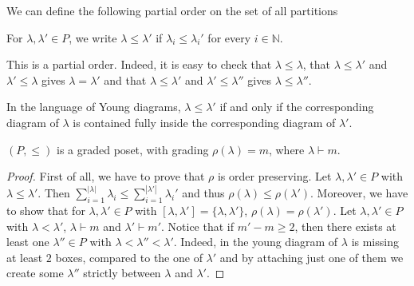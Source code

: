 We can define the following partial order on the set of all partitions
\begin{definition} For $\lambda,\lambda'\in P$, we write $\lambda\leq\lambda'$ if $\lambda_i\leq\lambda_i'$ for every $i\in\mathbb{N}$.
\end{definition}
\begin{remarks}
\begin{i_enum}
\item This is a partial order. Indeed, it is easy to check that $\lambda\leq\lambda$, that $\lambda\leq\lambda'$ and $\lambda'\leq\lambda$ gives $\lambda=\lambda'$ and that $\lambda\leq\lambda'$ and $\lambda'\leq\lambda''$ gives $\lambda\leq\lambda''$.
\item In the language of Young diagrams, $\lambda\leq\lambda'$ if and only if the corresponding diagram of $\lambda$ is contained fully inside the corresponding diagram of $\lambda'$.
\end{i_enum}
\end{remarks}

\begin{proposition} $(P,\leq)$ is a graded poset, with grading $\rho(\lambda)=m$, where $\lambda\vdash m$.
\end{proposition}
\begin{proof} First of all, we have to prove that $\rho$ is order preserving. Let $\lambda,\lambda'\in P$ with $\lambda\leq\lambda'$. Then $\sum_{i=1}^{|\lambda|}\lambda_i\leq\sum_{i=1}^{|\lambda'|}\lambda_i'$ and thus $\rho(\lambda)\leq\rho(\lambda')$. Moreover, we have to show that for $\lambda,\lambda'\in P$ with $[\lambda,\lambda']=\{\lambda,\lambda'\}$, $\rho(\lambda)=\rho(\lambda')$. Let $\lambda,\lambda'\in P$ with $\lambda<\lambda'$, $\lambda\vdash m$ and $\lambda'\vdash m'$. Notice that if $m'-m\geq2$, then there exists at least one $\lambda''\in P$ with $\lambda<\lambda''<\lambda'$. Indeed, in the young diagram of $\lambda$ is missing at least $2$ boxes, compared to the one of $\lambda'$ and by attaching just one of them we create some $\lambda''$ strictly between $\lambda$ and $\lambda'$.
\end{proof}

